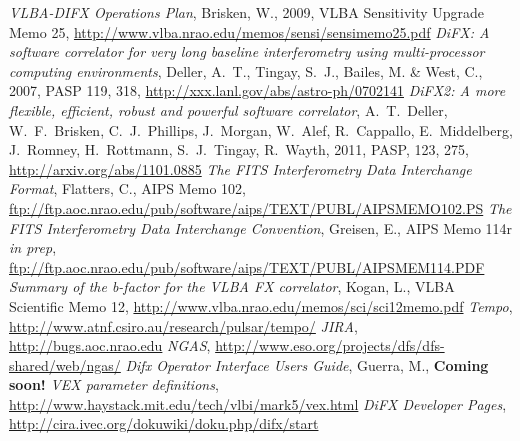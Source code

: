 \begin{thebibliography}{}
	{\it VLBA-DIFX Operations Plan}, Brisken, W., 2009, VLBA Sensitivity Upgrade Memo 25, \url{http://www.vlba.nrao.edu/memos/sensi/sensimemo25.pdf}
	{\it DiFX: A software correlator for very long baseline interferometry using multi-processor computing environments}, Deller, A.~T., Tingay, S.~J., Bailes, M. \& West, C., 2007, PASP 119, 318, \url{http://xxx.lanl.gov/abs/astro-ph/0702141}
	{\it DiFX2: A more flexible, efficient, robust and powerful software correlator}, A.\ T.\ Deller, W.\ F.\ Brisken, C.\ J.\ Phillips, J.\ Morgan, W.\ Alef, R.\ Cappallo, E.\ Middelberg, J.\ Romney, H.\ Rottmann, S.\ J.\ Tingay, R.\ Wayth, 2011, PASP, 123, 275, \url{http://arxiv.org/abs/1101.0885}
	{\it The FITS Interferometry Data Interchange Format}, Flatters, C., AIPS Memo 102, \url{ftp://ftp.aoc.nrao.edu/pub/software/aips/TEXT/PUBL/AIPSMEMO102.PS}
	{\it The FITS Interferometry Data Interchange Convention}, Greisen, E., AIPS Memo 114r {\it in prep}, \url{ftp://ftp.aoc.nrao.edu/pub/software/aips/TEXT/PUBL/AIPSMEM114.PDF}
	{\it Summary of the b-factor for the VLBA FX correlator}, Kogan, L., VLBA Scientific Memo 12, \url{http://www.vlba.nrao.edu/memos/sci/sci12memo.pdf}
	{\it Tempo}, \url{http://www.atnf.csiro.au/research/pulsar/tempo/}
	{\it JIRA}, \url{http://bugs.aoc.nrao.edu}
	{\it NGAS}, \url{http://www.eso.org/projects/dfs/dfs-shared/web/ngas/}
	{\it Difx Operator Interface Users Guide}, Guerra, M., {\bf Coming soon!}
	{\it VEX parameter definitions}, \url{http://www.haystack.mit.edu/tech/vlbi/mark5/vex.html}
	{\it DiFX Developer Pages}, \url{http://cira.ivec.org/dokuwiki/doku.php/difx/start}
\end{thebibliography}
